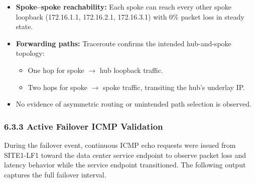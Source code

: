 \documentclass[11pt]{article}
\begin{document}
\begin{itemize}
  \item \textbf{Spoke--spoke reachability:}
        Each spoke can reach every other spoke loopback
        (172.16.1.1, 172.16.2.1, 172.16.3.1) with 0\% packet loss in steady state.
  \item \textbf{Forwarding paths:}
        Traceroute confirms the intended hub-and-spoke topology:
        \begin{itemize}
          \item One hop for spoke $\rightarrow$ hub loopback traffic.
          \item Two hops for spoke $\rightarrow$ spoke traffic, transiting the hub’s underlay IP.
        \end{itemize}
  \item No evidence of asymmetric routing or unintended path selection is observed.
\end{itemize}

%
%
%
%
\subsubsection{6.3.3 Active Failover ICMP Validation}
\label{sec:active-failover-validation}

During the failover event, continuous ICMP echo requests were issued from SITE1-LF1 toward the data center service endpoint to observe packet loss and latency behavior while the service endpoint transitioned. The following output captures the full failover interval.
\end{document}
